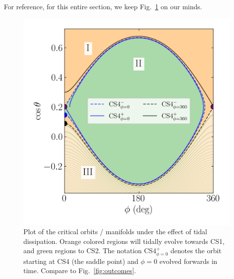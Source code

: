 \documentclass[11pt,
        usenames, %
        dvipsnames %
    ]{article}
\begin{document}
For reference, for this entire section, we keep Fig.~\ref{fig:manifolds} on our
minds.
\begin{figure}
    \centering
    \includegraphics[width=0.8\columnwidth]{6manifolds0_20.png}
    \caption{Plot of the critical orbits / manifolds under the effect of tidal
    dissipation. Orange colored regions will tidally evolve towards CS1, and
    green regions to CS2. The notation CS4$_{\phi=0}^+$ denotes the orbit
    starting at CS4 (the saddle point) and $\phi = 0$ evolved forwards in
    time. Compare to Fig.~\ref{fig:outcomes}.}\label{fig:manifolds}
\end{figure}
\end{document}
